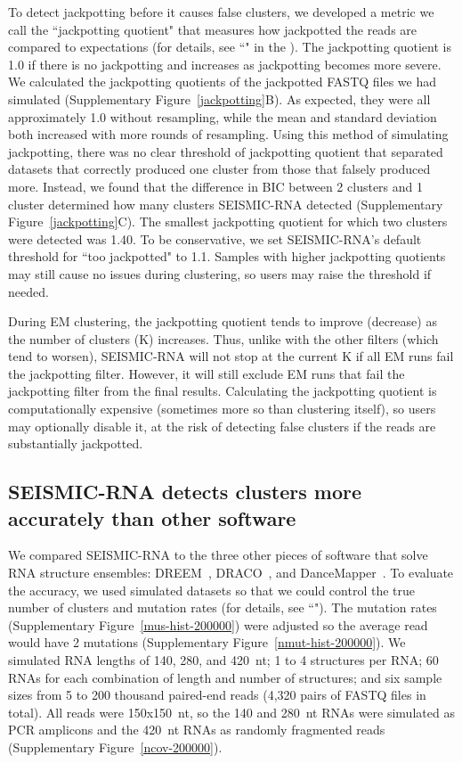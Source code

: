 \documentclass[11pt]{article}
\begin{document}
To detect jackpotting before it causes false clusters, we developed a metric we call the ``jackpotting quotient" that measures how jackpotted the reads are compared to expectations (for details, see ``" in the ).
The jackpotting quotient is 1.0 if there is no jackpotting and increases as jackpotting becomes more severe.
We calculated the jackpotting quotients of the jackpotted FASTQ files we had simulated (Supplementary Figure~\ref{jackpotting}B).
As expected, they were all approximately 1.0 without resampling, while the mean and standard deviation both increased with more rounds of resampling.
Using this method of simulating jackpotting, there was no clear threshold of jackpotting quotient that separated datasets that correctly produced one cluster from those that falsely produced more.
Instead, we found that the difference in BIC between 2 clusters and 1 cluster determined how many clusters SEISMIC-RNA detected (Supplementary Figure~\ref{jackpotting}C).
The smallest jackpotting quotient for which two clusters were detected was 1.40.
To be conservative, we set SEISMIC-RNA's default threshold for ``too jackpotted" to 1.1.
Samples with higher jackpotting quotients may still cause no issues during clustering, so users may raise the threshold if needed.

During EM clustering, the jackpotting quotient tends to improve (decrease) as the number of clusters (K) increases.
Thus, unlike with the other filters (which tend to worsen), SEISMIC-RNA will not stop at the current K if all EM runs fail the jackpotting filter.
However, it will still exclude EM runs that fail the jackpotting filter from the final results.
Calculating the jackpotting quotient is computationally expensive (sometimes more so than clustering itself), so users may optionally disable it, at the risk of detecting false clusters if the reads are substantially jackpotted.


\subsection{SEISMIC-RNA detects clusters more accurately than other software}

We compared SEISMIC-RNA to the three other pieces of software that solve RNA structure ensembles: DREEM~\cite{Tomezsko2020}, DRACO~\cite{Morandi2021}, and DanceMapper~\cite{Olson2022}.
To evaluate the accuracy, we used simulated datasets so that we could control the true number of clusters and mutation rates (for details, see ``").
The mutation rates (Supplementary Figure~\ref{mus-hist-200000}) were adjusted so the average read would have 2 mutations  (Supplementary Figure~\ref{nmut-hist-200000}).
We simulated RNA lengths of 140, 280, and 420~nt; 1 to 4 structures per RNA; 60 RNAs for each combination of length and number of structures; and six sample sizes from 5 to 200 thousand paired-end reads (4,320 pairs of FASTQ files in total).
All reads were 150x150~nt, so the 140 and 280~nt RNAs were simulated as PCR amplicons and the 420~nt RNAs as randomly fragmented reads (Supplementary Figure~\ref{ncov-200000}).
\end{document}
